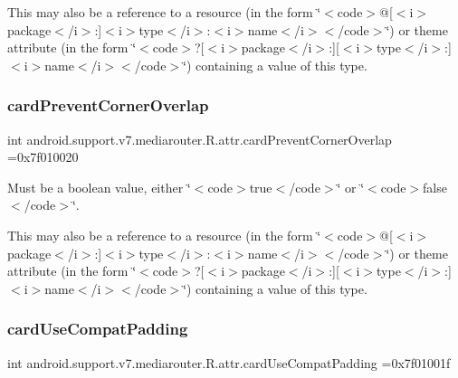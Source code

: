 This may also be a reference to a resource (in the form \char`\"{}$<$code$>$@\mbox{[}$<$i$>$package$<$/i$>$\+:\mbox{]}$<$i$>$type$<$/i$>$\+:$<$i$>$name$<$/i$>$$<$/code$>$\char`\"{}) or theme attribute (in the form \char`\"{}$<$code$>$?\mbox{[}$<$i$>$package$<$/i$>$\+:\mbox{]}\mbox{[}$<$i$>$type$<$/i$>$\+:\mbox{]}$<$i$>$name$<$/i$>$$<$/code$>$\char`\"{}) containing a value of this type. \mbox{\label{classandroid_1_1support_1_1v7_1_1mediarouter_1_1R_1_1attr_a0cda2b5a90fa880c0f5aee355536576b}} 
\subsubsection{\texorpdfstring{card\+Prevent\+Corner\+Overlap}{cardPreventCornerOverlap}}
{\footnotesize\ttfamily int android.\+support.\+v7.\+mediarouter.\+R.\+attr.\+card\+Prevent\+Corner\+Overlap =0x7f010020\hspace{0.3cm}{\ttfamily [static]}}

Must be a boolean value, either \char`\"{}$<$code$>$true$<$/code$>$\char`\"{} or \char`\"{}$<$code$>$false$<$/code$>$\char`\"{}. 

This may also be a reference to a resource (in the form \char`\"{}$<$code$>$@\mbox{[}$<$i$>$package$<$/i$>$\+:\mbox{]}$<$i$>$type$<$/i$>$\+:$<$i$>$name$<$/i$>$$<$/code$>$\char`\"{}) or theme attribute (in the form \char`\"{}$<$code$>$?\mbox{[}$<$i$>$package$<$/i$>$\+:\mbox{]}\mbox{[}$<$i$>$type$<$/i$>$\+:\mbox{]}$<$i$>$name$<$/i$>$$<$/code$>$\char`\"{}) containing a value of this type. \mbox{\label{classandroid_1_1support_1_1v7_1_1mediarouter_1_1R_1_1attr_ad80309d0db49d779271fad3c274a8e88}} 
\subsubsection{\texorpdfstring{card\+Use\+Compat\+Padding}{cardUseCompatPadding}}
{\footnotesize\ttfamily int android.\+support.\+v7.\+mediarouter.\+R.\+attr.\+card\+Use\+Compat\+Padding =0x7f01001f\hspace{0.3cm}{\ttfamily [static]}}

